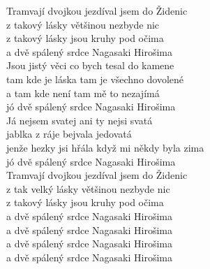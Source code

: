 
Tramvají dvojkou jezdíval jsem do Židenic\\
z takový lásky většinou nezbyde nic\\
z takový lásky jsou kruhy pod očima\\
a dvě spálený srdce Nagasaki Hirošima\\

Jsou jistý věci co bych tesal do kamene\\
tam kde je láska tam je všechno dovolené\\
a tam kde není tam mě to nezajímá\\
jó dvě spálený srdce Nagasaki Hirošima\\

Já nejsem svatej ani ty nejsi svatá\\
jablka z ráje bejvala jedovatá\\
jenže hezky jsi hřála když mi někdy byla zima\\
jó dvě spálený srdce Nagasaki Hirošima\\

Tramvají dvojkou jezdíval jsem do Židenic\\
z tak velký lásky většinou nezbyde nic\\
z takový lásky jsou kruhy pod očima\\
a dvě spálený srdce Nagasaki Hirošima\\
a dvě spálený srdce Nagasaki Hirošima\\
a dvě spálený srdce Nagasaki Hirošima\\
a dvě spálený srdce Nagasaki Hirošima

\newpage
